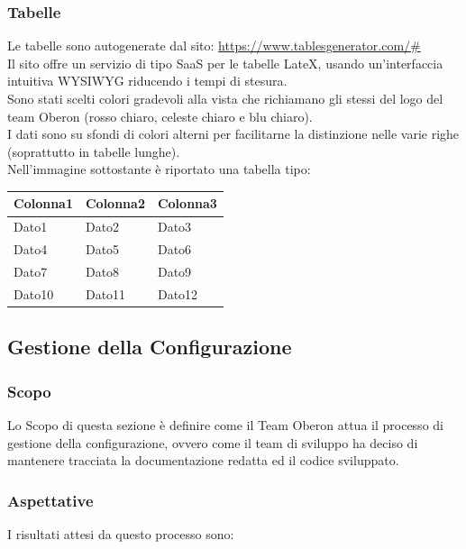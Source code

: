 \subsubsection{Tabelle}
Le tabelle sono autogenerate dal sito: \url{https://www.tablesgenerator.com/#}\\
Il sito offre un servizio di tipo SaaS per le tabelle LateX, usando un'interfaccia intuitiva WYSIWYG riducendo i tempi di stesura.\\
Sono stati scelti colori gradevoli alla vista che richiamano gli stessi del logo del team Oberon (rosso chiaro, celeste chiaro e blu chiaro).\\
I dati sono su sfondi di colori alterni per facilitarne la distinzione nelle varie righe (soprattutto in tabelle lunghe).\\
Nell'immagine sottostante è riportato una tabella tipo:
\begin{table}[H]
\centering
\begin{tabular}{|l|l|l|}
\hline
\rowcolor[HTML]{FFCCC9} 
\textbf{Colonna1} & \textbf{Colonna2} & \textbf{Colonna3} \\ \hline
\rowcolor[HTML]{ECF4FF} 
Dato1             & Dato2             & Dato3             \\ \hline
\rowcolor[HTML]{DAE8FC} 
Dato4             & Dato5             & Dato6            \\   \hline
\rowcolor[HTML]{ECF4FF} 
Dato7             & Dato8             & Dato9             \\ \hline
\rowcolor[HTML]{DAE8FC} 
Dato10             & Dato11             & Dato12            \\   \hline
\end{tabular}
\end{table}

\subsection{Gestione della Configurazione}

\subsubsection{Scopo}
Lo Scopo di questa sezione è definire come il Team Oberon attua il processo di gestione della configurazione, ovvero come il team di sviluppo ha deciso di mantenere tracciata la
documentazione redatta ed il codice sviluppato.

\subsubsection{Aspettative}
I risultati attesi da questo processo sono:

